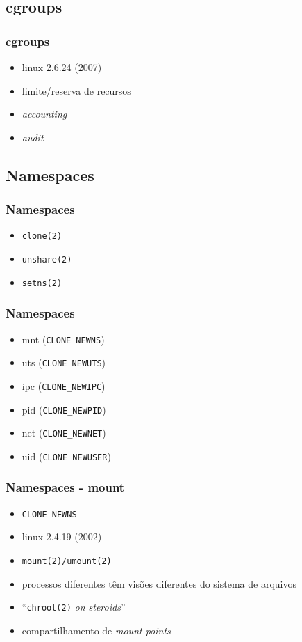 \documentclass{beamer}
\begin{document}
\subsection{cgroups}

\begin{frame}
    \frametitle{cgroups}
    \begin{itemize}
        \item linux 2.6.24 (2007)
        \item limite/reserva de recursos
        \item \textit{accounting}
        \item \textit{audit}
    \end{itemize}
\end{frame}

\subsection{Namespaces}

\begin{frame}
    \frametitle{Namespaces}
    \begin{itemize}
        \item \texttt{clone(2)}
        \item \texttt{unshare(2)}
        \item \texttt{setns(2)}
    \end{itemize}
\end{frame}

\begin{frame}
    \frametitle{Namespaces}
    \begin{itemize}
        \item mnt (\texttt{CLONE\_NEWNS})
        \item uts (\texttt{CLONE\_NEWUTS})
        \item ipc (\texttt{CLONE\_NEWIPC})
        \item pid (\texttt{CLONE\_NEWPID})
        \item net (\texttt{CLONE\_NEWNET})
        \item uid (\texttt{CLONE\_NEWUSER})
    \end{itemize}
\end{frame}

\begin{frame}
    \frametitle{Namespaces - mount}
    \begin{itemize}
        \item \texttt{CLONE\_NEWNS}
        \item linux 2.4.19 (2002)
        \item \texttt{mount(2)/umount(2)}
        \item processos diferentes têm visões diferentes do sistema de arquivos
        \item ``\texttt{chroot(2)} \textit{on steroids}''
        \item compartilhamento de \textit{mount points}
    \end{itemize}
\end{frame}
\end{document}
